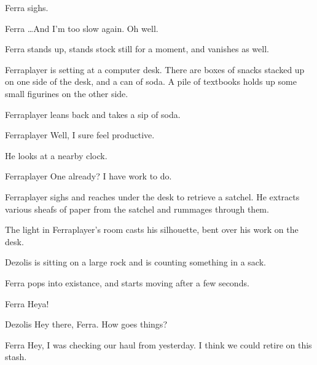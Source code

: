 Ferra sighs.

\begin{dialogue}[continued]{Ferra}
\ldots And I'm too slow again.
Oh well.
\end{dialogue}

Ferra stands up, stands stock still for a moment, and vanishes as well.



Ferraplayer is setting at a computer desk.
There are boxes of snacks stacked up on one side of the desk, and a can of soda.
A pile of textbooks holds up some small figurines on the other side.

Ferraplayer leans back and takes a sip of soda.

\begin{dialogue}{Ferraplayer}
Well, I sure feel productive.
\end{dialogue}

He looks at a nearby clock.

\begin{dialogue}{Ferraplayer}
One already?
I have work to do.
\end{dialogue}

Ferraplayer sighs and reaches under the desk to retrieve a satchel.
He extracts various sheafs of paper from the satchel and rummages through them.



The light in Ferraplayer's room casts his silhouette, bent over his work on the desk.



Dezolis is sitting on a large rock and is counting something in a sack.

Ferra pops into existance, and starts moving after a few seconds.

\begin{dialogue}{Ferra}
Heya!
\end{dialogue}

\begin{dialogue}{Dezolis}
Hey there, Ferra.
How goes things?
\end{dialogue}

\begin{dialogue}{Ferra}
Hey, I was checking our haul from yesterday.
I think we could retire on this stash.
\end{dialogue}


